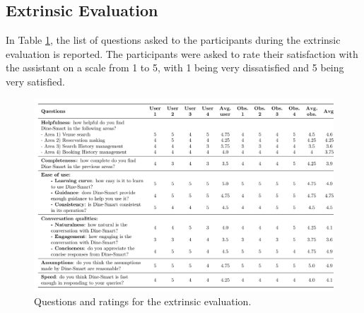 \documentclass[twocolumn]{article}
\begin{document}
\newpage

\subsection{Extrinsic Evaluation}

In Table \ref{tab:extrinsic-evaluation}, the list of questions asked to the participants during the extrinsic evaluation is reported. The participants were asked to rate their satisfaction with the assistant on a scale from 1 to 5, with 1 being very dissatisfied and 5 being very satisfied.

\begin{figure}[h!]
    \centering
    \includegraphics[width=1.0\textwidth]{images/extrinsic.png}
    \caption{Questions and ratings for the extrinsic evaluation.}
    \label{tab:extrinsic-evaluation}
\end{figure}
\end{document}
